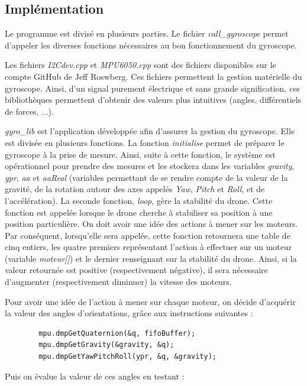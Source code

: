 \documentclass[a4paper,10pt]{report}
\begin{document}
	\subsection{Implémentation}
	  Le programme est divisé en plusieurs parties. Le fichier 
\textit{call\_gyroscope} permet d'appeler les diverses fonctions nécessaires au 
bon fonctionnement du gyroscope. 

	  Les fichiers \textit{I2Cdev.cpp} et \textit{MPU6050.cpp} sont des 
fichiers disponibles sur le compte GitHub de Jeff 
Roswberg\cite{jeff_rowberg_lib}. Ces fichiers permettent la gestion matérielle 
du gyroscope. Ainsi, d'un signal purement électrique et sans grande 
signification, ces bibliothèques permettent d'obtenir des valeurs plus 
intuitives (angles, différentiels de forces, ...).

	  \textit{gyro\_lib} est l'application développée afin d'assurer la 
gestion du gyroscope. Elle est divisée en plusieurs fonctions. La fonction 
\textit{initialise} permet de préparer le gyroscope à la prise de mesure. 
Ainsi, suite à cette fonction, le système est opérationnel pour prendre des 
mesures et les stockera dans les variables \textit{gravity}, \textit{ypr}, 
\textit{aa} et \textit{aaReal} (variables permettant de se rendre 
compte de la valeur de la gravité, de la rotation autour des axes appelés 
\textit{Yaw}, \textit{Pitch} et \textit{Roll}, et de l'accélération). La 
seconde fonction, \textit{loop},  gère la stabilité du drone. Cette fonction 
est appelée lorsque le drone cherche à stabiliser sa position à une position 
particulière. On doit avoir une idée des actions à mener sur les moteurs. Par 
conséquent, lorsqu'elle sera appelée, cette fonction retournera une table de 
cinq entiers, les quatre premiers représentant l'action à effectuer sur un 
moteur (variable \textit{moteur[]}) et le dernier renseignant sur la stabilité 
du drone. Ainsi, si la valeur retournée est positive (respectivement négative), 
il sera nécessaire d'augmenter (respectivement diminuer) la vitesse des 
moteurs. 

	  Pour avoir une idée de l'action à mener sur chaque moteur, on décide 
d'acquérir la valeur des angles d'orientations, grâce aux instructions 
suivantes : 

	  \begin{verbatim}
	    mpu.dmpGetQuaternion(&q, fifoBuffer);
	    mpu.dmpGetGravity(&gravity, &q);
	    mpu.dmpGetYawPitchRoll(ypr, &q, &gravity);
	  \end{verbatim}

	  Puis on évalue la valeur de ces angles en testant :
	  
\end{document}
